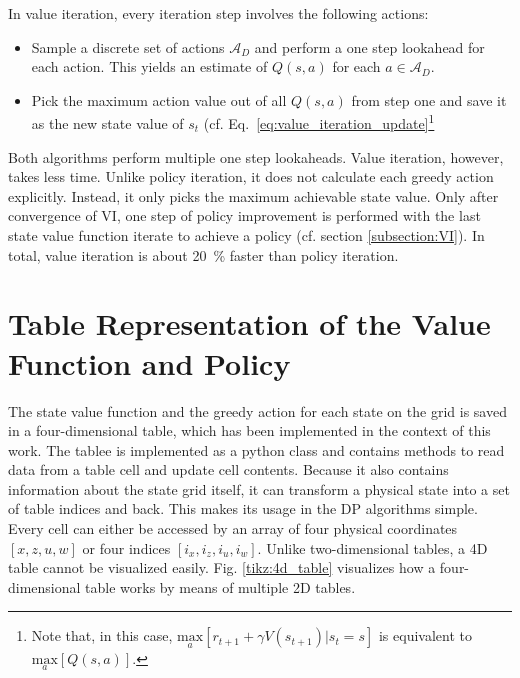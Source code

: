 In value iteration, every iteration step involves the following actions:

\begin{itemize}
	\item Sample a discrete set of actions $\mathcal{A}_D$ and perform a one step lookahead for each action. This yields an estimate of $Q(s,a)$ for each $a\in \mathcal{A}_D$.
	\item Pick the maximum action value out of all $Q(s,a)$ from step one and save it as the new state value of $s_t$ (cf. Eq.~\ref{eq:value_iteration_update}\footnote{Note that, in this case, $\underset{a}{\text{max}}[r_{t+1}+\gamma V(s_{t+1})|s_t=s]$ is equivalent to $\underset{a}{\text{max}}[Q(s,a)]$.}
\end{itemize}

Both algorithms perform multiple one step lookaheads. Value iteration, however, takes less time. Unlike policy iteration, it does not calculate each greedy action explicitly. Instead, it only picks the maximum achievable state value. Only after convergence of VI, one step of policy improvement is performed with the last state value function iterate to achieve a policy (cf. section \ref{subsection:VI}). In total, value iteration is about 20~\% faster than policy iteration. \newpage

\section{Table Representation of the Value Function and Policy}
\label{appendix_C}

The state value function and the greedy action for each state on the grid is saved in a four-dimensional table, which has been implemented in the context of this work. The tablee is implemented as a python class and contains methods to read data from a table cell and update cell contents. Because it also contains information about the state grid itself, it can transform a physical state into a set of table indices and back. This makes its usage in the DP algorithms simple. Every cell can either be accessed by an array of four physical coordinates  $[x,z,u,w]$  or four indices $[i_x,i_z,i_u,i_w]$.  Unlike two-dimensional tables, a 4D table cannot be visualized easily. Fig. \ref{tikz:4d_table} visualizes how a four-dimensional table works by means of multiple 2D tables. 

